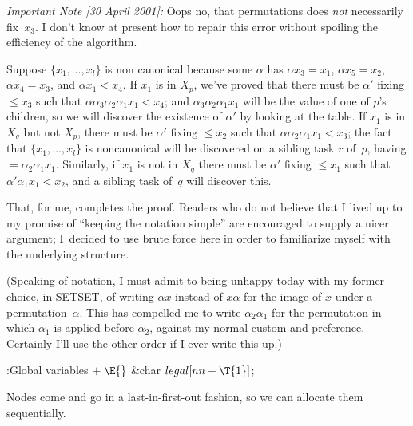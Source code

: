 {\sl Important Note [30 April 2001]:\/} Oops no, that permutations does
{\it not\/} necessarily fix~$x_3$. I don't know at present how to repair this
error without spoiling the efficiency of the algorithm.

Suppose $\{x_1,\ldots,x_l\}$ is non canonical because some $\alpha$ has
$\alpha x_3=x_1$, $\alpha x_5=x_2$, $\alpha x_4=x_3$, and $\alpha x_1<x_4$.
If $x_1$ is in $X_p$, we've proved that there must be $\alpha'$ fixing $\le
x_3$ such that $\alpha\alpha_3\alpha_2\alpha_1x_1<x_4$; and
$\alpha_3\alpha_2\alpha_1x_1$ will be the value of one of $p$'s children, so
we will discover the existence of $\alpha'$ by looking at the 
table.
If $x_1$ is in $X_q$ but not $X_p$, there must be $\alpha'$ fixing $\le x_2$
such that $\alpha\alpha_2\alpha_1x_1<x_3$; the fact that $\{x_1,\ldots,x_l\}$
is noncanonical will be discovered on a sibling task $r$ of~$p$, having
${}=\alpha_2\alpha_1x_1$. Similarly, if $x_1$ is not in
$X_q$ there
must be $\alpha'$ fixing $\le x_1$ such that $\alpha'\alpha_1x_1<x_2$, and
a sibling task of~$q$ will discover this.

That, for me, completes the proof.
Readers who do not believe that I lived up to my
promise of ``keeping the notation simple'' are encouraged to supply a nicer
argument; I~decided to use brute force here in order to familiarize myself with
the underlying structure.

(Speaking of notation, I must admit to being unhappy today with my former
choice, in
{\mc SETSET}, of writing $\alpha x$ instead of $x\alpha$ for the image of
$x$ under a permutation~$\alpha$. This has compelled me to write
$\alpha_2\alpha_1$
for the permutation in which $\alpha_1$ is applied before $\alpha_2$,
against my normal custom and preference. Certainly I'll use the other
order if I ever write this up.)

\Y\B\4:Global variables\X${}\mathrel+\E{}$\6
\&{char} ${}\\{legal}[\\{nn}+\T{1}]{}$;\par
\fi

Nodes come and go in a last-in-first-out fashion, so we
can allocate them
sequentially.

